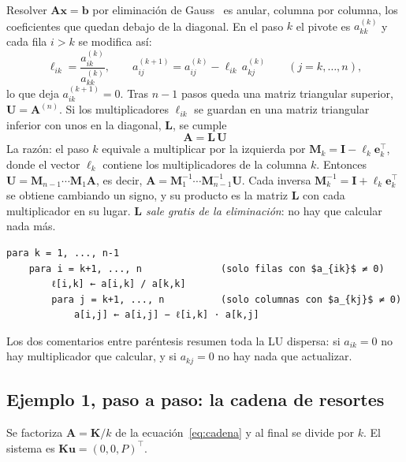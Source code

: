 \documentclass[11pt,a4paper]{article}
\newcommand{\T}{^{\top}}
\newcommand{\mK}{\bm{K}}
\begin{document}
Resolver $\bm{A}\bm{x}=\bm{b}$ por eliminación de Gauss~\cite{golub2013,trefethen1997} es anular, columna por columna, los coeficientes que quedan debajo de la diagonal. En el paso $k$ el pivote es $a_{kk}^{(k)}$ y cada fila $i>k$ se modifica así:
\begin{equation}\label{eq:multiplicador}
\ell_{ik}=\frac{a_{ik}^{(k)}}{a_{kk}^{(k)}},\qquad
a_{ij}^{(k+1)}=a_{ij}^{(k)}-\ell_{ik}\,a_{kj}^{(k)}\qquad(j=k,\dots,n),
\end{equation}
lo que deja $a_{ik}^{(k+1)}=0$. Tras $n-1$ pasos queda una matriz triangular superior, $\bm{U}=\bm{A}^{(n)}$. Si los multiplicadores $\ell_{ik}$ se guardan en una matriz triangular inferior con unos en la diagonal, $\bm{L}$, se cumple
\begin{equation}\label{eq:lu}
\boxed{\;\bm{A}=\bm{L}\,\bm{U}\;}
\end{equation}
La razón: el paso $k$ equivale a multiplicar por la izquierda por $\bm{M}_k=\bm{I}-\bm{\ell}_k\bm{e}_k\T$, donde el vector $\bm{\ell}_k$ contiene los multiplicadores de la columna $k$. Entonces $\bm{U}=\bm{M}_{n-1}\cdots\bm{M}_1\bm{A}$, es decir, $\bm{A}=\bm{M}_1^{-1}\cdots\bm{M}_{n-1}^{-1}\bm{U}$. Cada inversa $\bm{M}_k^{-1}=\bm{I}+\bm{\ell}_k\bm{e}_k\T$ se obtiene cambiando un signo, y su producto es la matriz $\bm{L}$ con cada multiplicador en su lugar. \emph{$\bm{L}$ sale gratis de la eliminación}: no hay que calcular nada más.

\begin{lstlisting}[style=algo,title={\textbf{Algoritmo 1.} LU sin pivoteo (Doolittle), sobre el propio arreglo $\bm{A}$.}]
para k = 1, ..., n-1
    para i = k+1, ..., n              (solo filas con $a_{ik}$ ≠ 0)
        ℓ[i,k] ← a[i,k] / a[k,k]
        para j = k+1, ..., n          (solo columnas con $a_{kj}$ ≠ 0)
            a[i,j] ← a[i,j] − ℓ[i,k] · a[k,j]
\end{lstlisting}

Los dos comentarios entre paréntesis resumen toda la LU dispersa: si $a_{ik}=0$ no hay multiplicador que calcular, y si $a_{kj}=0$ no hay nada que actualizar.

\subsection{Ejemplo 1, paso a paso: la cadena de resortes}\label{sec:ejemplo1}

Se factoriza $\bm{A}=\mK/k$ de la ecuación~\eqref{eq:cadena} y al final se divide por $k$. El sistema es $\mK\bm{u}=(0,0,P)\T$.
\end{document}
